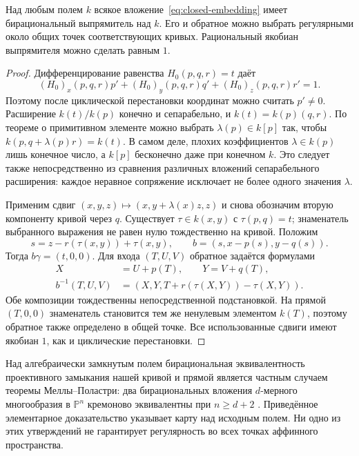 \begin{proposition}\label{prop:birational-any-field}
Над любым полем $k$ всякое вложение~\eqref{eq:closed-embedding}
имеет бирациональный выпрямитель над $k$. Его и обратное можно выбрать
регулярными около общих точек соответствующих кривых. Рациональный
якобиан выпрямителя можно сделать равным $1$.
\end{proposition}
\begin{proof}
Дифференцирование равенства $H_0(p,q,r)=t$ даёт
\[
 (H_0)_x(p,q,r)p'+(H_0)_y(p,q,r)q'+(H_0)_z(p,q,r)r'=1.
\]
Поэтому после циклической перестановки координат можно считать
$p'\ne0$. Расширение $k(t)/k(p)$ конечно и сепарабельно, и
$k(t)=k(p)(q,r)$. По теореме о примитивном элементе можно выбрать
$\lambda(p)\in k[p]$ так, чтобы
$k(p,q+\lambda(p)r)=k(t)$. В самом деле, плохих коэффициентов
$\lambda\in k(p)$ лишь конечное число, а $k[p]$ бесконечно даже
при конечном $k$. Это следует также непосредственно из сравнения
различных вложений сепарабельного расширения: каждое неравное
сопряжение исключает не более одного значения $\lambda$.

Применим сдвиг $(x,y,z)\mapsto(x,y+\lambda(x)z,z)$ и снова обозначим
вторую компоненту кривой через $q$. Существует
$\tau\in k(x,y)$ с $\tau(p,q)=t$; знаменатель выбранного выражения
не равен нулю тождественно на кривой. Положим
\begin{equation}\label{eq:birational-construction}
 s=z-r(\tau(x,y))+\tau(x,y),\qquad
 b=(s,x-p(s),y-q(s)).
\end{equation}
Тогда $b\gamma=(t,0,0)$. Для входа $(T,U,V)$ обратное задаётся формулами
\begin{equation}\label{eq:birational-inverse}
 \begin{split}
 X&=U+p(T),\qquad Y=V+q(T),\\
 b^{-1}(T,U,V)&=(X,Y,T+r(\tau(X,Y))-\tau(X,Y)).
 \end{split}
\end{equation}
Обе композиции тождественны непосредственной подстановкой. На прямой
$(T,0,0)$ знаменатель становится тем же ненулевым элементом $k(T)$,
поэтому обратное также определено в общей точке. Все использованные
сдвиги имеют якобиан $1$, как и циклические перестановки.
\end{proof}

Над алгебраически замкнутым полем бирациональная эквивалентность
проективного замыкания нашей кривой и прямой является частным случаем
теоремы Меллы--Поластри: два бирациональных вложения $d$-мерного
многообразия в $\mathbb P^n$ кремоново эквивалентны при $n\geq d+2$
\cite[теорема~1]{MP2009}. Приведённое элементарное доказательство
указывает карту над исходным полем. Ни одно из этих утверждений
не гарантирует регулярность во всех точках аффинного пространства.

